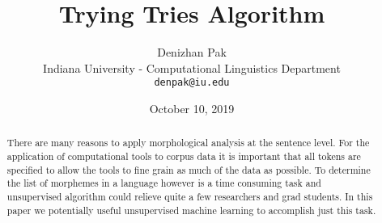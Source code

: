 \documentclass[11pt,a4paper]{article}
\title{Trying Tries Algorithm}
\author{Denizhan Pak \\ Indiana University - Computational
       Linguistics Department\\ {\tt denpak@iu.edu}}
\date{October 10, 2019}
\begin{document}
\maketitle
\begin{abstract}
        There are many reasons to apply morphological analysis at the 
        sentence level. For the application of computational tools to 
        corpus data it is important that all tokens are specified to 
        allow the tools to fine grain as much of the data as possible.
        To determine the list of morphemes in a language however is a time
        consuming task and unsupervised algorithm could relieve quite a few
        researchers and grad students. In this paper we potentially useful
        unsupervised machine learning to accomplish just this task.
\end{abstract}
\end{document}
